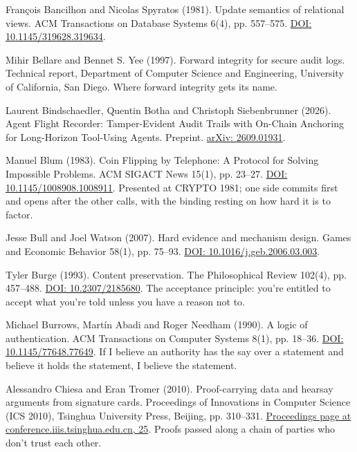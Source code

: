 \documentclass[11pt,twoside]{article}
\theoremstyle{thielethm}
\theoremstyle{thieledef}
\theoremstyle{thieledef}
\theoremstyle{thieledef}
\theoremstyle{thielethm}
\theoremstyle{thieleobs}
\theoremstyle{thielethm}
\begin{document}
\noindent Fran\c{c}ois Bancilhon and Nicolas Spyratos (1981). Update semantics of relational views. ACM Transactions on Database Systems 6(4), pp. 557--575. \href{https://doi.org/10.1145/319628.319634}{DOI: 10.1145/319628.319634}.
\par\medskip

\noindent Mihir Bellare and Bennet S. Yee (1997). Forward integrity for secure audit logs. Technical report, Department of Computer Science and Engineering, University of California, San Diego. Where forward integrity gets its name.
\par\medskip

\noindent Laurent Bindschaedler, Quentin Botha and Christoph Siebenbrunner (2026). Agent Flight Recorder: Tamper-Evident Audit Trails with On-Chain Anchoring for Long-Horizon Tool-Using Agents. Preprint. \href{https://arxiv.org/abs/2609.01931}{arXiv: 2609.01931}.
\par\medskip

\noindent Manuel Blum (1983). Coin Flipping by Telephone: A Protocol for Solving Impossible Problems. ACM SIGACT News 15(1), pp. 23--27. \href{https://doi.org/10.1145/1008908.1008911}{DOI: 10.1145/1008908.1008911}. Presented at CRYPTO 1981; one side commits first and opens after the other calls, with the binding resting on how hard it is to factor.
\par\medskip

\noindent Jesse Bull and Joel Watson (2007). Hard evidence and mechanism design. Games and Economic Behavior 58(1), pp. 75--93. \href{https://doi.org/10.1016/j.geb.2006.03.003}{DOI: 10.1016/j.geb.2006.03.003}.
\par\medskip

\noindent Tyler Burge (1993). Content preservation. The Philosophical Review 102(4), pp. 457--488. \href{https://doi.org/10.2307/2185680}{DOI: 10.2307/2185680}. The acceptance principle: you're entitled to accept what you're told unless you have a reason not to.
\par\medskip

\noindent Michael Burrows, Mart\'in Abadi and Roger Needham (1990). A logic of authentication. ACM Transactions on Computer Systems 8(1), pp. 18--36. \href{https://doi.org/10.1145/77648.77649}{DOI: 10.1145/77648.77649}. If I believe an authority has the say over a statement and believe it holds the statement, I believe the statement.
\par\medskip

\noindent Alessandro Chiesa and Eran Tromer (2010). Proof-carrying data and hearsay arguments from signature cards. Proceedings of Innovations in Computer Science (ICS 2010), Tsinghua University Press, Beijing, pp. 310--331. \href{https://conference.iiis.tsinghua.edu.cn/ICS2010/content/papers/25.html}{Proceedings page at conference.iiis.tsinghua.edu.cn, 25}. Proofs passed along a chain of parties who don't trust each other.
\par\medskip
\end{document}
